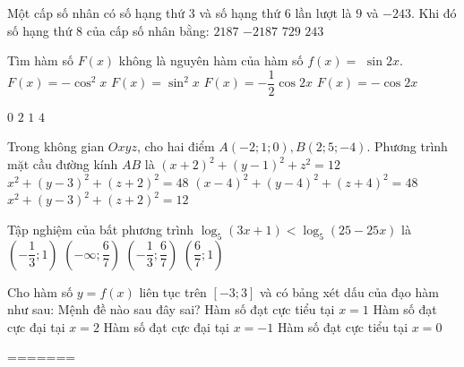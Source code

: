 \begin{ex}%
Một cấp số nhân có số hạng thứ $3$ và số hạng thứ $6$ lần lượt là $9$ và $-243$. Khi đó số hạng thứ $8$ của cấp số nhân bằng:
\choice
{$2187$}
{\True $-2187$}
{$729$}
{$243$}

\end{ex}
\begin{ex}%
Tìm hàm số $F(x)$ không là nguyên hàm của hàm số $f(x)=$ $\sin 2 x$.
\choice
{$F(x)=-\cos ^2 x$}
{$F(x)=\sin ^2 x$}
{$F(x)=-\dfrac{1}{2} \cos 2 x$}
{\True $F(x)=-\cos 2 x$}

\end{ex}
\begin{ex}%
{\vspace{-0.5cm}
}
\choice
{$0$}
{\True $2$}
{$1$}
{$4$}
\end{ex}
\begin{ex}%
Trong không gian $O x y z$, cho hai điểm $A(-2; 1; 0), B(2; 5;-4)$.
Phương trình mặt cầu đường kính $AB$ là
\choice
{$(x+2)^2+(y-1)^2+z^2=12$}
{$x^2+(y-3)^2+(z+2)^2=48$}
{$(x-4)^2+(y-4)^2+(z+4)^2=48$}
{\True $x^2+(y-3)^2+(z+2)^2=12$}

\end{ex}
\begin{ex}%
Tập nghiệm của bất phương trình $\log_5(3 x+1)<\log_5(25-25 x)$ là
\choice
{$\left(-\dfrac{1}{3}; 1\right)$}
{$\left(-\infty; \dfrac{6}{7}\right)$}
{\True $\left(-\dfrac{1}{3}; \dfrac{6}{7}\right)$}
{$\left(\dfrac{6}{7}; 1\right)$}

\end{ex}
\begin{ex}%
Cho hàm số $y=f(x)$ liên tục trên $[-3; 3]$ và có bảng xét dấu của đạo hàm như sau:
Mệnh đề nào sau đây sai?
\choice
{Hàm số đạt cực tiểu tại $x=1$}
{Hàm số đạt cực đại tại $x=2$}
{Hàm số đạt cực đại tại $x=-1$}
{\True Hàm số đạt cực tiểu tại $x=0$}

\end{ex}

=======

